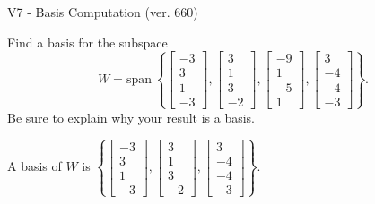 \begin{exercise}
  \begin{exerciseTitle}V7 - Basis Computation (ver. 660)\end{exerciseTitle}
  \begin{exerciseStatement}
    Find a basis for the subspace 
\[W=\mathrm{span}\ \left\{\left[\begin{array}{r}
-3 \\
3 \\
1 \\
-3
\end{array}\right] , \left[\begin{array}{r}
3 \\
1 \\
3 \\
-2
\end{array}\right] , \left[\begin{array}{r}
-9 \\
1 \\
-5 \\
1
\end{array}\right] , \left[\begin{array}{r}
3 \\
-4 \\
-4 \\
-3
\end{array}\right]\right\}.\]
 Be sure to explain why your result is a basis.


  \end{exerciseStatement}
  \begin{exerciseAnswer}
   A basis of \(W\) is  \(\left\{\left[\begin{array}{r}
-3 \\
3 \\
1 \\
-3
\end{array}\right] , \left[\begin{array}{r}
3 \\
1 \\
3 \\
-2
\end{array}\right] , \left[\begin{array}{r}
3 \\
-4 \\
-4 \\
-3
\end{array}\right]\right\}\).
  


  \end{exerciseAnswer}
\end{exercise}